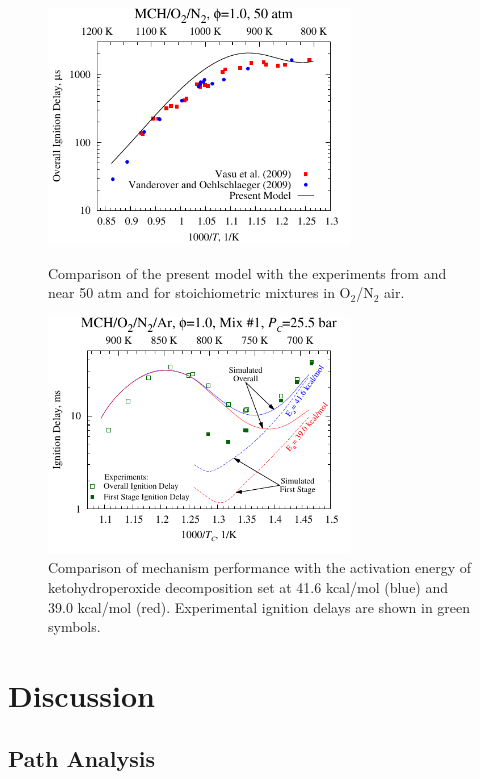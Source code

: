 \documentclass[12pt, letterpaper]{article}
\begin{document}
\begin{figure}
    \centering
    \begin{minipage}[t]{0.45\textwidth}
        \includegraphics[width=8cm]{../figures/05-MCH/mch-shocks}
        \caption{Comparison of the present model with the experiments from
            \textcite{Vasu2009} and \textcite{Vanderover2009} near 50 atm
            and for stoichiometric mixtures in O$_2$/N$_2$ air.}
        \label{fig:mch-shocks}
    \end{minipage}
    \quad
    \begin{minipage}[t]{0.45\textwidth}
        \includegraphics[width=8cm]{../figures/05-MCH/mch-energy}
        \caption{Comparison of mechanism performance with the activation energy
            of ketohydroperoxide decomposition set at 41.6 kcal/mol (blue) and
            39.0 kcal/mol (red). Experimental ignition delays are shown in
            green symbols.}
        \label{fig:mch-energy}
    \end{minipage}
\end{figure}

\section{Discussion}
\label{sec:discussion}
\subsection{Path Analysis}
\label{sec:path-analysis}
\end{document}
